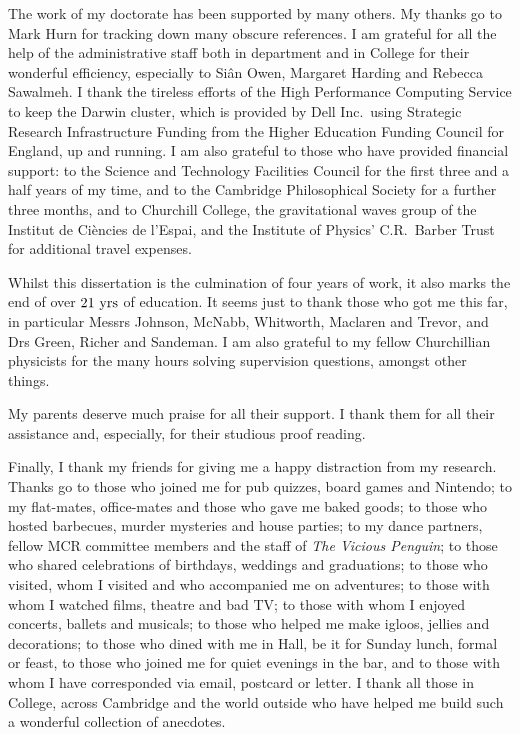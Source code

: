 The work of my doctorate has been supported by many others. My thanks go to Mark Hurn for tracking down many obscure references. I am grateful for all the help of the administrative staff both in department and in College for their wonderful efficiency, especially to Si{\^a}n Owen, Margaret Harding and Rebecca Sawalmeh. I thank the tireless efforts of the High Performance Computing Service to keep the Darwin cluster, which is provided by Dell Inc.\ using Strategic Research Infrastructure Funding from the Higher Education Funding Council for England, up and running. I am also grateful to those who have provided financial support: to the Science and Technology Facilities Council for the first three and a half years of my time, and to the Cambridge Philosophical Society for a further three months, and to Churchill College, the gravitational waves group of the Institut de Ci{\`e}ncies de l'Espai, and the Institute of Physics' C.R.\ Barber Trust for additional travel expenses.

Whilst this dissertation is the culmination of four years of work, it also marks the end of over $21~\mathrm{yrs}$ of education. It seems just to thank those who got me this far, in particular Messrs Johnson, McNabb, Whitworth, Maclaren and Trevor, and Drs Green, Richer and Sandeman. I am also grateful to my fellow Churchillian physicists for the many hours solving supervision questions, amongst other things.

My parents deserve much praise for all their support. I thank them for all their assistance and, especially, for their studious proof reading.

Finally, I thank my friends for giving me a happy distraction from my research. Thanks go to those who joined me for pub quizzes, board games and Nintendo; to my flat-mates, office-mates and those who gave me baked goods; to those who hosted barbecues, murder mysteries and house parties; to my dance partners, fellow MCR committee members and the staff of \textit{The Vicious Penguin}; to those who shared celebrations of birthdays, weddings and graduations; to those who visited, whom I visited and who accompanied me on adventures; to those with whom I watched films, theatre and bad TV; to those with whom I enjoyed concerts, ballets and musicals; to those who helped me make igloos, jellies and decorations; to those who dined with me in Hall, be it for Sunday lunch, formal or feast, to those who joined me for quiet evenings in the bar, and to those with whom I have corresponded via email, postcard or letter. I thank all those in College, across Cambridge and the world outside who have helped me build such a wonderful collection of anecdotes.

